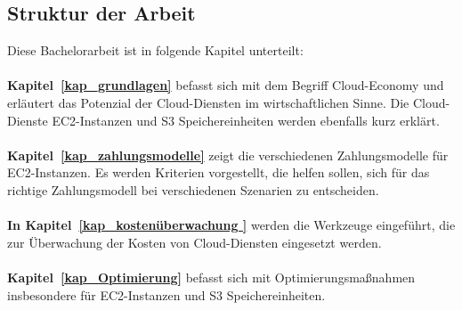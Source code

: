\begin{comment}
\subsection*{Einschränkungen}
\addcontentsline{toc}{subsection}{Einschränkungen}

Der Schwerpunkt dieser Arbeit liegt auf EC2-Instanzen, da diese in der Regel den größten Anteil an der Rechnung ausmachen.
An zweiter Stelle stehen S3-Speichereinheiten, weil sie einen erheblichen Teil der Kosten darstellen.

{\cite{AMZ08,AMZ09}} 
\\
Diese Arbeit legt den Fokus auf die Optimierung der oben genannten Dienste.
Als Überwachungswerkzeuge für die Kosten werden die AWS CloudWatch, der AWS Cost-Explorer und der AWS Trusted Advisor untersucht. 
\end{comment}
\subsection{Struktur der Arbeit}


Diese Bachelorarbeit ist in folgende Kapitel unterteilt:\\\\
\textbf{Kapitel~\ref{kap_grundlagen}} 
befasst sich mit dem Begriff Cloud-Economy und erläutert das Potenzial der Cloud-Diensten im wirtschaftlichen Sinne. Die Cloud-Dienste EC2-Instanzen und S3 Speichereinheiten werden ebenfalls kurz erklärt. %
\\\\
\textbf{Kapitel~\ref{kap_zahlungsmodelle}} 
zeigt die verschiedenen Zahlungsmodelle für EC2-Instanzen. Es werden Kriterien vorgestellt, die helfen sollen, sich für das richtige Zahlungsmodell bei verschiedenen Szenarien zu entscheiden. 
\\\\
\textbf{In Kapitel~\ref{kap_kostenüberwachung }} werden die Werkzeuge eingeführt, die zur Überwachung der Kosten von Cloud-Diensten eingesetzt werden.
\\\\
\textbf{Kapitel~\ref{kap_Optimierung}} befasst sich mit Optimierungsmaßnahmen insbesondere für EC2-Instanzen und S3 Speichereinheiten.

